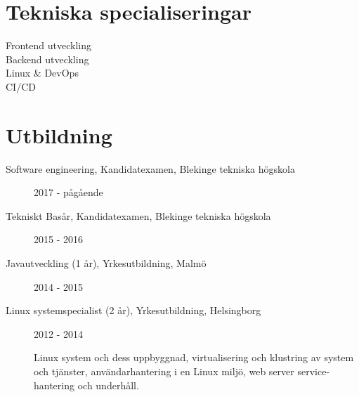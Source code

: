 \documentclass{article}
\begin{document}
\vspace{40pt} %

\begin{minipage}[t]{0.4\textwidth}

\section*{\textcolor{colorBlue}{Tekniska specialiseringar}}

\begin{description}
  \item [ Frontend utveckling ]
  \item [ Backend utveckling ]
  \vspace{-5pt}\item [ Linux \& DevOps ] 
  \vspace{-5pt}\item [ CI/CD ]
  \vspace{-5pt}
\end{description}

\end{minipage}%
\hfill
\begin{minipage}[t]{0.6\textwidth}

\section*{\textcolor{colorBlue}{Utbildning}}

\begin{description}
  \item [ Software engineering, Kandidatexamen, Blekinge tekniska högskola ] 2017 - pågående
  \item [ Tekniskt Basår, Kandidatexamen, Blekinge tekniska högskola ] 2015 - 2016
  \item [ Javautveckling (1 år), Yrkesutbildning, Malmö ] 2014 - 2015

  \item [ Linux systemspecialist (2 år), Yrkesutbildning, Helsingborg ] 2012 - 2014 
  
  Linux system och dess uppbyggnad, virtualisering och klustring av 
 system och tjänster, användarhantering i en Linux miljö, web server 
 service-hantering och underhåll.
\end{description}

\end{minipage}%
\vspace{10pt}
\end{document}
